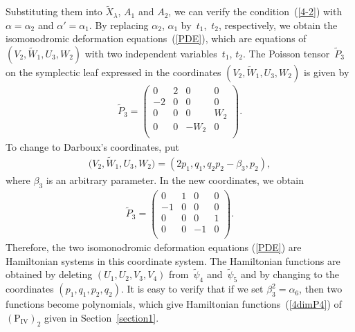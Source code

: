 \documentclass[10pt,a4paper]{amsart}
\numberwithin{equation}{section}
\begin{document}
Substituting them into $\widetilde{X}_\lambda$, $A_1$ and $A_2$, we can verify the condition~(\ref{4-2}) with $\alpha = \alpha _2$ and $\alpha ' = \alpha _1$. By replacing $\alpha _2$, $\alpha _1$ by~$t_1$,~$t_2$, respectively, we obtain the isomonodromic deformation equations~(\ref{PDE}), which are equations of $(V_2,\widetilde{W}_1 ,U_3, W_2)$ with two independent variables~$t_1$, $t_2$. The Poisson tensor~$\widetilde{P}_3$ on the symplectic leaf expressed in the coordinates $(V_2,\widetilde{W}_1 ,U_3, W_2)$ is given by
\begin{gather*}
\widetilde{P}_3 = \left(
\begin{matrix}
0 &2 &0 &0 \\
-2&0 &0 &0 \\
0&0 &0 &W_2 \\
0&0 &-W_2 &0 \\
\end{matrix}
\right).
\end{gather*}
To change to Darboux's coordinates, put
\begin{gather*}
\big(V_2,\widetilde{W}_1 ,U_3, W_2\big) = (2p_1, q_1, q_2p_2- \beta_3, p_2),
\end{gather*}
where $\beta_3$ is an arbitrary parameter. In the new coordinates, we obtain
\begin{gather}
\widetilde{P}_3 = \left(
\begin{matrix}
0 &1 &0 &0 \\
-1&0 &0 &0 \\
0&0 &0 &1 \\
0&0 &-1 &0 \\
\end{matrix}
\right).\label{P}
\end{gather}
Therefore, the two isomonodromic deformation equations (\ref{PDE}) are Hamiltonian systems in this coordinate system. The Hamiltonian functions are obtained by deleting $(U_1,U_2,V_3,V_4)$ from~$\widetilde{\psi}_4$ and~$\widetilde{\psi}_5$ and by changing to the coordinates $(p_1, q_1, p_2, q_2)$. It is easy to verify that if we set $\beta_3^2=\alpha _6$, then two functions become polynomials, which give Hamiltonian functions~(\ref{4dimP4}) of~$(\text{P}_\text{IV})_2$ given in Section~\ref{section1}.
\end{document}
